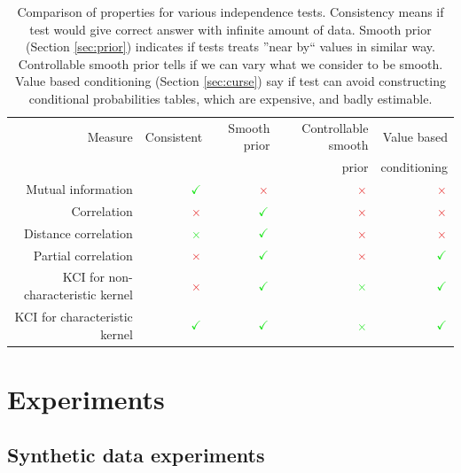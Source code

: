 \documentclass{article} %
\begin{document}
\begin{table}[t]
\centering
\tiny
\begin{tabular}{rrrrr}
\hline
Measure & Consistent & Smooth prior & Controllable smooth & Value based\\
& & & prior & conditioning\\
\hline
Mutual information & $\color{LimeGreen} \checkmark $ & $\color{Maroon}\times$ & $\color{Maroon}\times$ &   $\color{Maroon}\times$ \\
Correlation & $\color{Maroon}\times$  & $\color{LimeGreen} \checkmark $ & $\color{Maroon}\times$ & $\color{Maroon}\times$ \\
Distance correlation & $\color{LimeGreen}\times$  & $\color{LimeGreen} \checkmark $ & $\color{Maroon}\times$ & $\color{Maroon}\times$ \\
Partial correlation & $\color{Maroon}\times$  & $\color{LimeGreen} \checkmark $ & $\color{Maroon}\times$ & $\color{LimeGreen}\checkmark$ \\
KCI for non-characteristic kernel & $\color{Maroon}\times$  & $\color{LimeGreen} \checkmark $ & $\color{LimeGreen}\times$ & $\color{LimeGreen}\checkmark$ \\
KCI for characteristic kernel & $\color{LimeGreen}\checkmark$  & $\color{LimeGreen} \checkmark $ & $\color{LimeGreen}\times$ & $\color{LimeGreen}\checkmark$ \\
\hline
\end{tabular}
\caption{Comparison of properties for various independence tests. Consistency means if test would give correct answer with infinite amount of data. Smooth prior (Section \ref{sec:prior}) indicates if tests treats ''near by`` values in similar way. Controllable smooth prior tells if we can vary what we consider to be smooth. Value based conditioning (Section \ref{sec:curse}) say if test can avoid constructing conditional probabilities tables, which are expensive, and badly estimable.}
  
\label{tab:compar}
\end{table}


\section{Experiments}


\subsection{Synthetic data experiments}
\end{document}
